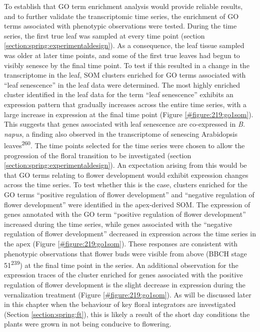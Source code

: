 \documentclass[12pt,]{book}
\begin{document}
To establish that GO term enrichment analysis would provide reliable
results, and to further validate the transcriptomic time series, the
enrichment of GO terms associated with phenotypic observations were
tested. During the time series, the first true leaf was sampled at every
time point (section \ref{section:spring:experimentaldesign}). As a
consequence, the leaf tissue sampled was older at later time points, and
some of the first true leaves had begun to visibly senesce by the final
time point. To test if this resulted in a change in the transcriptome in
the leaf, SOM clusters enriched for GO terms associated with ``leaf
senescence'' in the leaf data were determined. The most highly enriched
cluster identified in the leaf data for the term ``leaf senescence''
exhibits an expression pattern that gradually increases across the
entire time series, with a large increase in expression at the final
time point (Figure \ref{#figure:219:go1som}). This suggests that genes
associated with leaf senescence are co-expressed in \emph{B. napus}, a
finding also observed in the transcriptome of senescing Arabidopsis
leaves\textsuperscript{260}. The time points selected for the time
series were chosen to allow the progression of the floral transition to
be investigated (section \ref{section:spring:experimentaldesign}). An
expectation arising from this would be that GO terms relating to flower
development would exhibit expression changes across the time series. To
test whether this is the case, clusters enriched for the GO terms
``positive regulation of flower development'' and ``negative regulation
of flower development'' were identified in the apex-derived SOM. The
expression of genes annotated with the GO term ``positive regulation of
flower development'' increased during the time series, while genes
associated with the ``negative regulation of flower development''
decreased in expression across the time series in the apex (Figure
\ref{#figure:219:go1som}). These responses are consistent with
phenotypic observations that flower buds were visible from above (BBCH
stage 51\textsuperscript{239}) at the final time point in the series. An
additional observation for the expression traces of the cluster enriched
for genes associated with the positive regulation of flower development
is the slight decrease in expression during the vernalization treatment
(Figure \ref{#figure:219:go1som}). As will be discussed later in this
chapter when the behaviour of key floral integrators are investigated
(Section \ref{section:spring:ft}), this is likely a result of the short
day conditions the plants were grown in not being conducive to
flowering.
\end{document}
